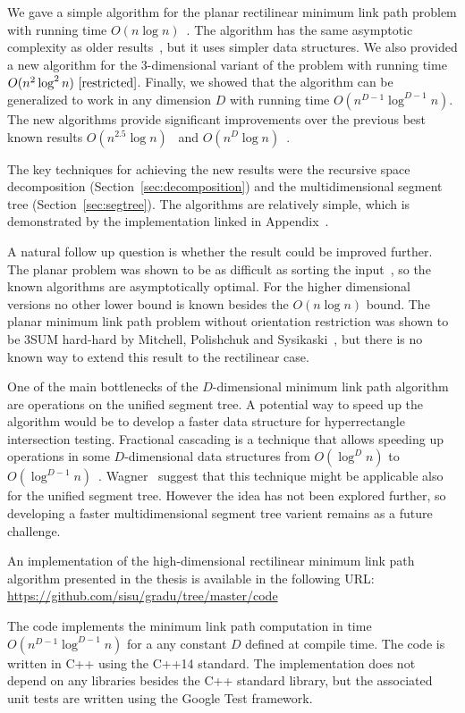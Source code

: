 \documentclass[english,gradu]{tktltiki2018}
\begin{document}
We gave a simple algorithm for the planar rectilinear minimum link path problem with running time $O(n\log n)$~\cite{revisited}.
The algorithm has the same asymptotic complexity as older results~\cite{dasnar,sato}, but it uses simpler data structures.
We also provided a new algorithm for the 3-dimensional variant of the problem with running time $O(n^2\log^2 n)~\cite{restricted}$.
Finally, we showed that the algorithm can be generalized to work in any dimension $D$ with running time $O(n^{D-1}\log^{D-1}n)$.
The new algorithms provide significant improvements over the previous best known results $O(n^{2.5}\log n)$~\cite{wagner} and $O(n^D\log n)$~\cite{de1992}.

The key techniques for achieving the new results were the recursive space decomposition (Section~\ref{sec:decomposition}) and the multidimensional segment tree (Section~\ref{sec:segtree}).
The algorithms are relatively simple, which is demonstrated by the implementation linked in Appendix~\apxsrc.

A natural follow up question is whether the result could be improved further.
The planar problem was shown to be as difficult as sorting the input~\cite{dasnar}, so the known algorithms are asymptotically optimal.
For the higher dimensional versions no other lower bound is known besides the $O(n\log n)$ bound.
The planar minimum link path problem without orientation restriction was shown to be 3SUM hard-hard by Mitchell, Polishchuk and Sysikaski~\cite{revisited}, but there is no known way to extend this result to the rectilinear case.

One of the main bottlenecks of the $D$-dimensional minimum link path algorithm are operations on the unified segment tree.
A potential way to speed up the algorithm would be to develop a faster data structure for hyperrectangle intersection testing.
Fractional cascading is a technique that allows speeding up operations in some $D$-dimensional data structures from $O(\log^D n)$ to $O(\log^{D-1} n)$~\cite{fractional,ortho}.
Wagner~\cite{unified} suggest that this technique might be applicable also for the unified segment tree.
However the idea has not been explored further, so developing a faster multidimensional segment tree varient remains as a future challenge.



\nocite{*}



\lastpage

\appendices

\pagestyle{empty}


An implementation of the high-dimensional rectilinear minimum link path algorithm presented in the thesis is available in the following URL: \\
\url{https://github.com/sisu/gradu/tree/master/code}

The code implements the minimum link path computation in time $O(n^{D-1}\log^{D-1}n)$ for a any constant $D$ defined at compile time.
The code is written in C++ using the C++14 standard.
The implementation does not depend on any libraries besides the C++ standard library, but the associated unit tests are written using the Google Test framework.
\end{document}
